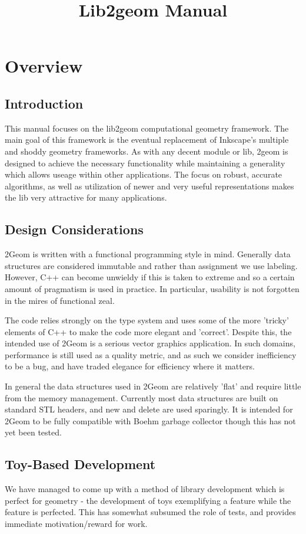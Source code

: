 \documentclass{book}
\title{Lib2geom Manual}
\begin{document}
\chapter{Overview}

\section{Introduction}

This manual focuses on the lib2geom computational geometry framework.
The main goal of this framework is the eventual replacement of
Inkscape's multiple and shoddy geometry frameworks. As with any decent
module or lib, 2geom is designed to achieve the necessary functionality
while maintaining a generality which allows useage within other
applications.  The focus on robust, accurate algorithms, as well as
utilization of newer and very useful representations makes the lib
very attractive for many applications.

\section{Design Considerations}
2Geom is written with a functional programming style in mind.
Generally data structures are considered immutable and rather than
assignment we use labeling.  However, C++ can become unwieldy if
this is taken to extreme and so a certain amount of pragmatism is
used in practice.  In particular, usability is not forgotten in the
mires of functional zeal.

The code relies strongly on the type system and uses some of the more
'tricky' elements of C++ to make the code more elegant and 'correct'.
Despite this, the intended use of 2Geom is a serious vector graphics
application. In such domains, performance is still used as a quality
metric, and as such we consider inefficiency to be a bug, and have
traded elegance for efficiency where it matters.

In general the data structures used in 2Geom are relatively 'flat'
and require little from the memory management.  Currently most data
structures are built on standard STL headers\cite{stl}, and new and
delete are used sparingly.  It is intended for 2Geom to be fully
compatible with Boehm garbage collector\cite{boehm} though this has
not yet been tested.

\section{Toy-Based Development}
We have managed to come up with a method of library development
which is perfect for geometry - the development of toys exemplifying
a feature while the feature is perfected.  This has somewhat subsumed
the role of tests, and provides immediate motivation/reward for work.
\end{document}
